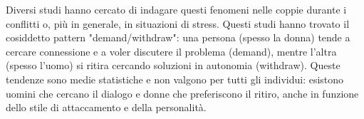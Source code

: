 \documentclass[12pt]{book} %
\begin{document}
Diversi studi hanno cercato di indagare questi fenomeni nelle coppie durante i conflitti o, più in generale, in situazioni di stress. Questi studi hanno trovato il cosiddetto pattern "demand/withdraw": una persona (spesso la donna) tende a cercare connessione e a voler discutere il problema (demand), mentre l’altra (spesso l’uomo) si ritira cercando soluzioni in autonomia (withdraw). Queste tendenze sono medie statistiche e non valgono per tutti gli individui: esistono uomini che cercano il dialogo e donne che preferiscono il ritiro, anche in funzione dello stile di attaccamento e della personalità.
\end{document}
